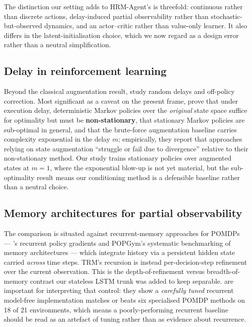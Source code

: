 \documentclass[11pt]{article}
\begin{document}
The distinction our setting adds to HRM-Agent's is threefold: continuous rather than discrete actions, delay-induced partial observability rather than stochastic-but-observed dynamics, and an actor--critic rather than value-only learner. It also differs in the latent-initialisation choice, which we now regard as a design error rather than a neutral simplification.

\subsection{Delay in reinforcement learning}
\label{sec:delaylit}

Beyond the classical augmentation result, \citet{ramstedt2021rlrandomdelays} study random delays and off-policy correction. Most significant as a caveat on the present frame, \citet{derman2021delayed} prove that under execution delay, deterministic Markov policies over the \emph{original} state space suffice for optimality but must be \textbf{non-stationary}, that stationary Markov policies are sub-optimal in general, and that the brute-force augmentation baseline carries complexity exponential in the delay $m$; empirically, they report that approaches relying on state augmentation ``struggle or fail due to divergence'' relative to their non-stationary method. Our study trains stationary policies over augmented states at $m=1$, where the exponential blow-up is not yet material, but the sub-optimality result means our conditioning method is a defensible baseline rather than a neutral choice.

\subsection{Memory architectures for partial observability}

The comparison is situated against recurrent-memory approaches for POMDPs --- \citet{bakker2007recurrent}'s recurrent policy gradients and POPGym's systematic benchmarking of memory architectures \citep{morad2023popgym} --- which integrate history via a persistent hidden state carried \emph{across} time steps. TRM's recursion is instead per-decision-step refinement over the current observation. This is the depth-of-refinement versus breadth-of-memory contrast our stateless LSTM trunk was added to keep separable. \citet{ni2022recurrent} are important for interpreting that control: they show a \emph{carefully tuned} recurrent model-free implementation matches or beats six specialised POMDP methods on 18 of 21 environments, which means a poorly-performing recurrent baseline should be read as an artefact of tuning rather than as evidence about recurrence.
\end{document}
